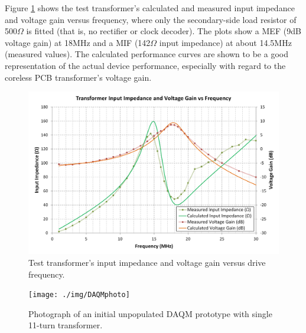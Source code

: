 \documentclass[conference]{IEEEtran}
\begin{document}
Figure \ref{fig:NoRect} shows the test transformer's calculated and measured input impedance and voltage gain versus frequency, where only the secondary-side load resistor of 500$\Omega$ is fitted (that is, no rectifier or clock decoder).  The plots show a MEF (9dB voltage gain) at 18MHz and a MIF (142$\Omega$ input impedance) at about 14.5MHz (measured values).  The calculated performance curves are shown to be a good representation of the actual device performance, especially with regard to the coreless PCB transformer's voltage gain.
%
\begin{figure}[t]
	\centering
	\includegraphics[width=1.0\columnwidth]{./img/NoRectTF}
	\caption{Test transformer's input impedance and voltage gain versus drive frequency.}
	\label{fig:NoRect}
\end{figure}
%
\begin{figure}[t]
	\centering
	\texttt{[image: ./img/DAQMphoto]}
	\caption{Photograph of an initial unpopulated DAQM prototype with single 11-turn transformer.}
	\label{fig:DAQMphoto}
\end{figure}
%
\end{document}
